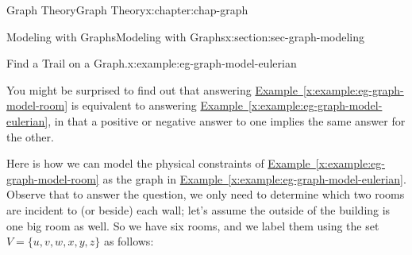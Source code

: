 \documentclass[oneside,10pt,]{book}
\newcommand{\xreffont}{\relax}
\numberwithin{equation}{section}
\begin{document}
\begin{chapterptx}{Graph Theory}{}{Graph Theory}{}{}{x:chapter:chap-graph}
\begin{sectionptx}{Modeling with Graphs}{}{Modeling with Graphs}{}{}{x:section:sec-graph-modeling}
\begin{example}{Find a Trail on a Graph.}{x:example:eg-graph-model-eulerian}
\begin{sidebyside}{1}{0.3}{0.3}{0}
\begin{sbspanel}{0.4}
{
}%
\end{sbspanel}%
\end{sidebyside}%
\end{example}
You might be surprised to find out that answering \hyperref[x:example:eg-graph-model-room]{Example~{\xreffont\ref{x:example:eg-graph-model-room}}} is equivalent to answering \hyperref[x:example:eg-graph-model-eulerian]{Example~{\xreffont\ref{x:example:eg-graph-model-eulerian}}}, in that a positive or negative answer to one implies the same answer for the other.%
\par
Here is how we can model the physical constraints of \hyperref[x:example:eg-graph-model-room]{Example~{\xreffont\ref{x:example:eg-graph-model-room}}} as the graph in \hyperref[x:example:eg-graph-model-eulerian]{Example~{\xreffont\ref{x:example:eg-graph-model-eulerian}}}. Observe that to answer the question, we only need to determine which two rooms are incident to (or beside) each wall; let's assume the outside of the building is one big room as well. So we have six rooms, and we label them using the set \(V = \{u,v,w,x,y,z\}\) as follows:%
\begin{sidebyside}{1}{0.325}{0.325}{0}%
\begin{sbspanel}{0.35}%
\end{sbspanel}
\end{sidebyside}
\end{sectionptx}
\end{chapterptx}
\end{document}
